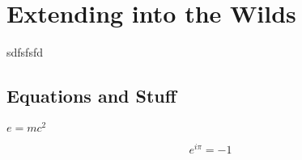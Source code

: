 





\chapter{Extending into the Wilds}\label{c1}

sdfsfsfd

\section{Equations and Stuff}\label{c1basicformatting:sec}

$e = mc^2$

\begin{equation}
e^{i\pi}=-1 
\end{equation}

\begin{figure}
\end{figure}

